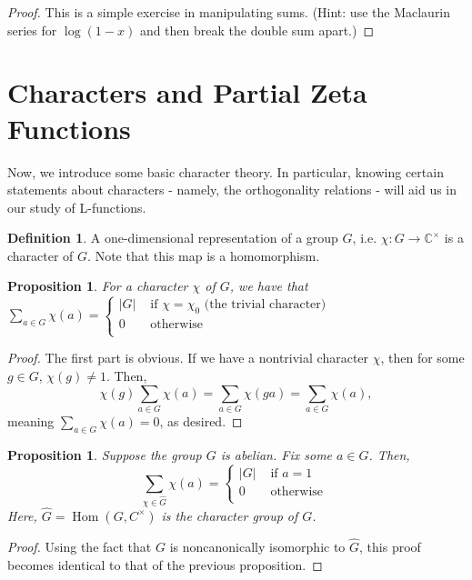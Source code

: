 \documentclass{article}
\DeclareMathOperator{\Hom}{Hom}
\newcommand{\CC}{\mathbb{C}}
\theoremstyle{plain}
\newtheorem{prop}[thm]{Proposition}
\theoremstyle{definition}
\newtheorem{defn}[thm]{Definition}
\theoremstyle{remark}
\numberwithin{equation}{section}
\numberwithin{thm}{section}
\begin{document}
\begin{proof}
This is a simple exercise in manipulating sums. (Hint: use the Maclaurin series for $\log(1-x)$ and then break the double sum apart.)
\end{proof}


\section{Characters and Partial Zeta Functions}

Now, we introduce some basic character theory. In particular, knowing certain statements about characters - namely, the orthogonality relations - will aid us in our study of L-functions.

\begin{defn}
A one-dimensional representation of a group $G$, i.e. $\chi: G \longrightarrow \CC^{\times}$ is a character of $G$. Note that this map is a homomorphism.
\end{defn}

\begin{prop} \label{3.2}
For a character $\chi$ of $G$, we have that $\sum_{a \in G} \chi(a) = \begin{cases}
|G| & \text{ if } \chi = \chi_{0} \text{ (the trivial character)} \\
0 &  \text { otherwise } \\
\end{cases}$  

\end{prop}

\begin{proof}
The first part is obvious. If we have a nontrivial character $\chi$, then for some $g \in G$, $\chi(g) \neq 1$. Then, $$\chi(g)\sum_{a \in G} \chi(a) = \sum_{a \in G} \chi(ga) = \sum_{a \in G} \chi(a),$$ meaning $\sum_{a \in G} \chi(a) = 0$, as desired. 
\end{proof}

\begin{prop} \label{3.3}
Suppose the group $G$ is abelian. Fix some $a \in G$. Then, $$\sum_{\chi \in \hat{G}} \chi(a) = \begin{cases}
|G| & \text{ if } a = 1 \\
0 & \text { otherwise } \\
\end{cases}$$ Here, $\hat{G} = \Hom(G, C^{\times})$ is the character group of $G$. 
\end{prop}

\begin{proof}
Using the fact that $G$ is noncanonically isomorphic to $\hat{G}$, this proof becomes identical to that of the previous proposition. 
\end{proof}
\end{document}
